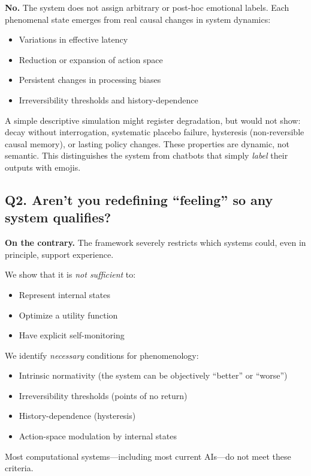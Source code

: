 \documentclass[a4paper,11pt,twocolumn]{article}
\begin{document}
\textbf{No.} The system does not assign arbitrary or post-hoc emotional labels. Each phenomenal state emerges from real causal changes in system dynamics:

\begin{itemize}
    \item Variations in effective latency
    \item Reduction or expansion of action space
    \item Persistent changes in processing biases
    \item Irreversibility thresholds and history-dependence
\end{itemize}

A simple descriptive simulation might register degradation, but would not show: decay without interrogation, systematic placebo failure, hysteresis (non-reversible causal memory), or lasting policy changes. These properties are dynamic, not semantic. This distinguishes the system from chatbots that simply \textit{label} their outputs with emojis.

\subsection*{Q2. Aren't you redefining ``feeling'' so any system qualifies?}

\textbf{On the contrary.} The framework severely restricts which systems could, even in principle, support experience.

We show that it is \textit{not sufficient} to:
\begin{itemize}
    \item Represent internal states
    \item Optimize a utility function
    \item Have explicit self-monitoring
\end{itemize}

We identify \textit{necessary} conditions for phenomenology:
\begin{itemize}
    \item Intrinsic normativity (the system can be objectively ``better'' or ``worse'')
    \item Irreversibility thresholds (points of no return)
    \item History-dependence (hysteresis)
    \item Action-space modulation by internal states
\end{itemize}

Most computational systems---including most current AIs---do not meet these criteria.
\end{document}

